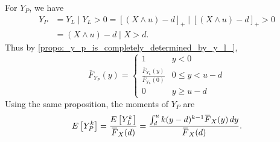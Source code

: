\documentclass[notoc,notitlepage]{tufte-book}
\begin{document}
For $Y_P$, we have
\begin{align*}
  Y_P &= Y_L \mid Y_L > 0 = [ (X \land u) - d ]_+ \mid [ (X \land u) - d ]_+ > 0 \\
      &= (X \land u) - d \mid X > d.
\end{align*}
Thus by \cref{propo:_y_p_is_completely_determined_by_y_l_},
\begin{equation*}
  \bar{F}_{Y_P}(y) = \begin{cases}
      1 & y < 0 \\
      \frac{\bar{F}_{Y_L}(y)}{\bar{F}_{Y_L}(0)} & 0 \leq y < u - d \\
      0 & y \geq u - d
    \end{cases}
\end{equation*}
Using the same proposition, the moments of $Y_P$ are
\begin{equation*}
  E \left[ Y_P^k \right] = \frac{E \left[ Y_L^k \right]}{\bar{F}_X(d)} = \frac{\int_{d}^{u} k ( y - d )^{k - 1} \bar{F}_X(y) \dif{y}}{\bar{F}_X(d)}.
\end{equation*}
\end{document}
